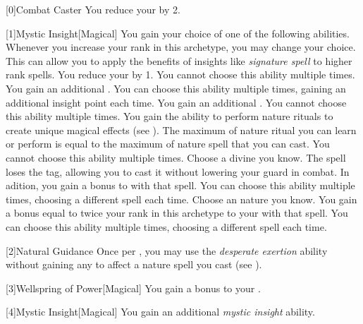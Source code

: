         [0]{Combat Caster} You reduce your  by 2.

        [1]{Mystic Insight}[Magical]
        You gain your choice of one of the following abilities.
        Whenever you increase your rank in this archetype, you may change your choice.
        This can allow you to apply the benefits of insights like \textit{signature spell} to higher rank spells.
        {
             You reduce your  by 1.
                You cannot choose this ability multiple times.
             You gain an additional .
                You can choose this ability multiple times, gaining an additional insight point each time.
             You gain an additional .
                You cannot choose this ability multiple times.
             You gain the ability to perform nature rituals to create unique magical effects (see ).
                The maximum  of nature ritual you can learn or perform is equal to the maximum  of nature spell that you can cast.
                You cannot choose this ability multiple times.
             Choose a divine  you know.
                The spell loses the  tag, allowing you to cast it without lowering your guard in combat.
                In adition, you gain a  bonus to  with that spell.
                You can choose this ability multiple times, choosing a different spell each time.
             Choose an nature  you know.
                You gain a bonus equal to twice your rank in this archetype to your  with that spell.
                You can choose this ability multiple times, choosing a different spell each time.
        }

        [2]{Natural Guidance} Once per , you may use the \textit{desperate exertion} ability without gaining any  to affect a nature spell you cast (see ).

        [3]{Wellspring of Power}[Magical]
        You gain a  bonus to your  .

        [4]{Mystic Insight}[Magical]
        You gain an additional \textit{mystic insight} ability.

